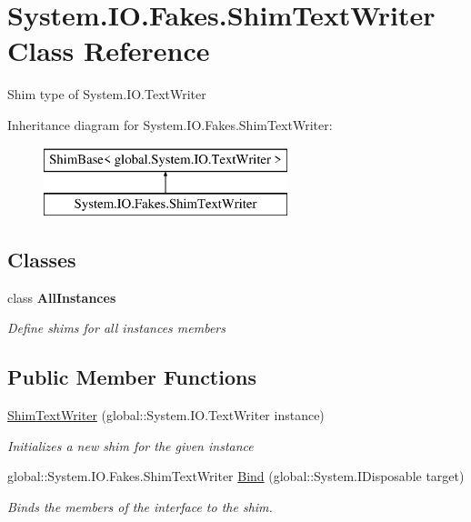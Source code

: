 \hypertarget{class_system_1_1_i_o_1_1_fakes_1_1_shim_text_writer}{\section{System.\-I\-O.\-Fakes.\-Shim\-Text\-Writer Class Reference}
\label{class_system_1_1_i_o_1_1_fakes_1_1_shim_text_writer}
}


Shim type of System.\-I\-O.\-Text\-Writer 


Inheritance diagram for System.\-I\-O.\-Fakes.\-Shim\-Text\-Writer\-:\begin{figure}[H]
\begin{center}
\leavevmode
\includegraphics[height=2.000000cm]{class_system_1_1_i_o_1_1_fakes_1_1_shim_text_writer}
\end{center}
\end{figure}
\subsection*{Classes}
\begin{DoxyCompactItemize}
\item 
class {\bfseries All\-Instances}
\begin{DoxyCompactList}\small\item\em Define shims for all instances members\end{DoxyCompactList}\end{DoxyCompactItemize}
\subsection*{Public Member Functions}
\begin{DoxyCompactItemize}
\item 
\hyperlink{class_system_1_1_i_o_1_1_fakes_1_1_shim_text_writer_a98e15405b9851325235470305d6d6d00}{Shim\-Text\-Writer} (global\-::\-System.\-I\-O.\-Text\-Writer instance)
\begin{DoxyCompactList}\small\item\em Initializes a new shim for the given instance\end{DoxyCompactList}\item 
global\-::\-System.\-I\-O.\-Fakes.\-Shim\-Text\-Writer \hyperlink{class_system_1_1_i_o_1_1_fakes_1_1_shim_text_writer_aec5f8ea78ae03fd6abb1ac305086fa06}{Bind} (global\-::\-System.\-I\-Disposable target)
\begin{DoxyCompactList}\small\item\em Binds the members of the interface to the shim.\end{DoxyCompactList}\end{DoxyCompactItemize}
